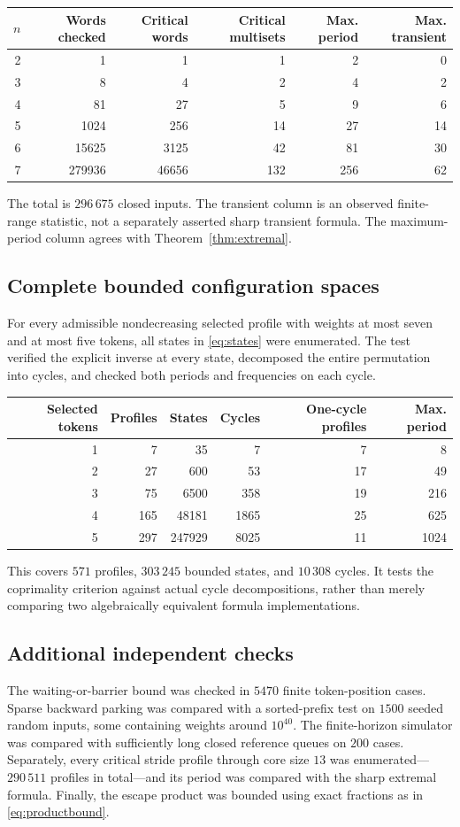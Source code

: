 \documentclass[11pt,letterpaper]{article}
\theoremstyle{definition}
\begin{document}
\begin{center}
\begin{tabular}{@{}rrrrrr@{}}
\toprule
$n$ & Words checked & Critical words & Critical multisets & Max. period & Max. transient\\
\midrule
2&1&1&1&2&0\\
3&8&4&2&4&2\\
4&81&27&5&9&6\\
5&1024&256&14&27&14\\
6&15625&3125&42&81&30\\
7&279936&46656&132&256&62\\
\bottomrule
\end{tabular}
\end{center}
The total is $296\,675$ closed inputs. The transient column is an observed
finite-range statistic, not a separately asserted sharp transient formula.
The maximum-period column agrees with Theorem~\ref{thm:extremal}.

\subsection{Complete bounded configuration spaces}
For every admissible nondecreasing selected profile with weights at most
seven and at most five tokens, all states in \eqref{eq:states} were enumerated.
The test verified the explicit inverse at every state, decomposed the entire
permutation into cycles, and checked both periods and frequencies on each
cycle.

\begin{center}
\begin{tabular}{@{}rrrrrr@{}}
\toprule
Selected tokens & Profiles & States & Cycles & One-cycle profiles & Max. period\\
\midrule
1&7&35&7&7&8\\
2&27&600&53&17&49\\
3&75&6500&358&19&216\\
4&165&48181&1865&25&625\\
5&297&247929&8025&11&1024\\
\bottomrule
\end{tabular}
\end{center}
This covers $571$ profiles, $303\,245$ bounded states, and $10\,308$ cycles.
It tests the coprimality criterion against actual cycle decompositions, rather
than merely comparing two algebraically equivalent formula implementations.

\subsection{Additional independent checks}
The waiting-or-barrier bound was checked in $5470$ finite token-position
cases. Sparse backward parking was compared with a sorted-prefix test on
$1500$ seeded random inputs, some containing weights around $10^{40}$.
The finite-horizon simulator was compared with sufficiently long closed
reference queues on $200$ cases. Separately, every critical stride profile
through core size $13$ was enumerated---$290\,511$ profiles in total---and its
period was compared with the sharp extremal formula. Finally, the escape
product was bounded using exact fractions as in \eqref{eq:productbound}.
\end{document}
